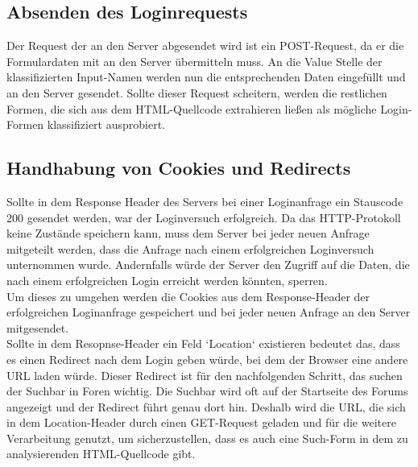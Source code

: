 \subsection{Absenden des Loginrequests}
Der Request der an den Server abgesendet wird ist ein POST-Request, da er die Formulardaten mit an den Server übermitteln muss.
An die Value Stelle der klassifizierten Input-Namen werden nun die entsprechenden Daten eingefüllt und an den Server gesendet.
Sollte dieser Request scheitern, werden die restlichen Formen, die sich aus dem HTML-Quellcode extrahieren ließen als mögliche Login-Formen klassifiziert ausprobiert.
\subsection{Handhabung von Cookies und Redirects}
Sollte in dem Response Header des Servers bei einer Loginanfrage ein Stauscode 200 gesendet werden, war der Loginversuch erfolgreich. Da das HTTP-Protokoll keine Zustände speichern kann, muss dem Server bei jeder neuen Anfrage mitgeteilt werden, dass die Anfrage nach einem erfolgreichen Loginversuch unternommen wurde. Andernfalls würde der Server den Zugriff auf die Daten, die nach einem erfolgreichen Login erreicht werden könnten, sperren.\\
Um dieses zu umgehen werden die Cookies aus dem Response-Header der erfolgreichen Loginanfrage gespeichert und bei jeder neuen Anfrage an den Server mitgesendet.\\
Sollte in dem Resopnse-Header ein Feld `Location` existieren bedeutet das, dass es einen Redirect nach dem Login geben würde, bei dem der Browser eine andere URL laden würde. Dieser Redirect ist für den nachfolgenden Schritt, das suchen der Suchbar in Foren wichtig. Die Suchbar wird oft auf der Startseite des Forums angezeigt und der Redirect führt genau dort hin. Deshalb wird die URL, die sich in dem Location-Header durch einen GET-Request geladen und für die weitere Verarbeitung genutzt, um sicherzustellen, dass es auch eine Such-Form in dem zu analysierenden HTML-Quellcode gibt.
\newpage

